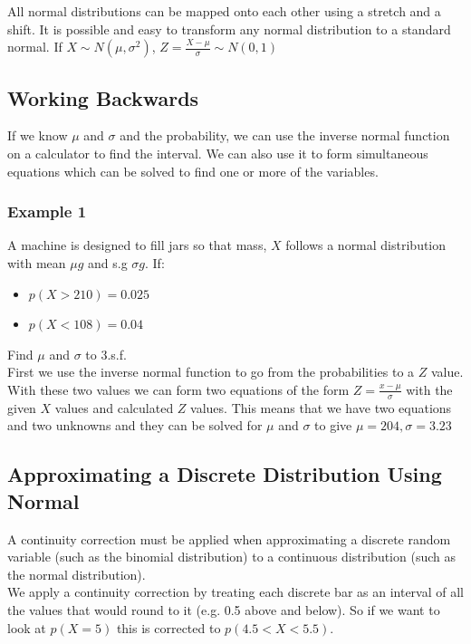 \documentclass[a4paper,12pt]{article}
\begin{document}
All normal distributions can be mapped onto each other using a stretch and a shift. It is possible and easy to transform any normal distribution to a standard normal. If $X \sim N(\mu, \sigma^2)$, $Z = \frac{X - \mu}{\sigma} \sim N(0,1)$ \\

\subsection*{Working Backwards}
If we know $\mu$ and $\sigma$ and the probability, we can use the inverse normal function on a calculator to find the interval. We can also use it to form simultaneous equations which can be solved to find one or more of the variables. \\
\subsubsection*{Example 1}
A machine is designed to fill jars so that mass, $X$ follows a normal distribution with mean $\mu g$ and s.g $\sigma g$. If:
\begin{itemize}
	\item $p(X > 210) = 0.025$ 
	\item $p(X < 108) = 0.04$
\end{itemize}
Find $\mu$ and $\sigma$ to 3.s.f. \\ 

First we use the inverse normal function to go from the probabilities to a $Z$ value. With these two values we can form two equations of the form $Z = \frac{x - \mu}{\sigma}$ with the given $X$ values and calculated $Z$ values. This means that we have two equations and two unknowns and they can be solved for $\mu$ and $\sigma$ to give $\mu = 204, \sigma = 3.23$ \\
\subsection*{Approximating a Discrete Distribution Using Normal}
A continuity correction must be applied when approximating a discrete random variable (such as the binomial distribution) to a continuous distribution (such as the normal distribution). \\

We apply a continuity correction by treating each discrete bar as an interval of all the values that would round to it (e.g. 0.5 above and below). So if we want to look at $p(X=5)$ this is corrected to $p(4.5 < X < 5.5)$. 
\end{document}
